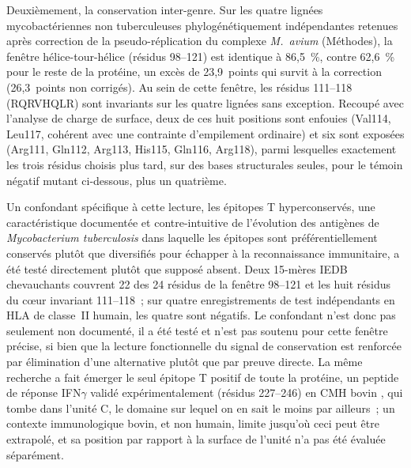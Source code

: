 \documentclass[11pt,a4paper]{article}
\newcommand{\mtb}{\textit{Mycobacterium tuberculosis}}
\begin{document}
Deuxièmement, la conservation inter-genre. Sur les quatre lignées mycobactériennes non
tuberculeuses phylogénétiquement indépendantes retenues après correction de la pseudo-réplication
du complexe \textit{M.\ avium} (Méthodes), la fenêtre hélice-tour-hélice (résidus 98--121) est
identique à 86,5~\%, contre 62,6~\% pour le reste de la protéine, un excès de 23,9~points qui
survit à la correction (26,3~points non corrigés). Au sein de cette fenêtre, les résidus 111--118
(RQRVHQLR) sont invariants sur les quatre lignées sans exception. Recoupé avec l'analyse de charge
de surface, deux de ces huit positions sont enfouies (Val114, Leu117, cohérent avec une contrainte
d'empilement ordinaire) et six sont exposées (Arg111, Gln112, Arg113, His115, Gln116, Arg118),
parmi lesquelles exactement les trois résidus choisis plus tard, sur des bases structurales seules,
pour le témoin négatif mutant ci-dessous, plus un quatrième.

Un confondant spécifique à cette lecture, les épitopes T hyperconservés, une caractéristique
documentée et contre-intuitive de l'évolution des antigènes de \mtb{} dans laquelle les épitopes
sont préférentiellement conservés plutôt que diversifiés pour échapper à la reconnaissance
immunitaire, a été testé directement plutôt que supposé absent. Deux 15-mères IEDB chevauchants
couvrent 22 des 24 résidus de la fenêtre 98--121 et les huit résidus du cœur invariant 111--118~;
sur quatre enregistrements de test indépendants en HLA de classe~II humain, les quatre sont
négatifs. Le confondant n'est donc pas seulement non documenté, il a été testé et n'est pas soutenu
pour cette fenêtre précise, si bien que la lecture fonctionnelle du signal de conservation est
renforcée par élimination d'une alternative plutôt que par preuve directe. La même recherche a fait
émerger le seul épitope T positif de toute la protéine, un peptide de réponse IFN$\gamma$ validé
expérimentalement (résidus 227--246) en CMH bovin \citep{farrell2016botb}, qui tombe dans l'unité C,
le domaine sur lequel on en sait le moins par ailleurs~; un contexte immunologique bovin, et non
humain, limite jusqu'où ceci peut être extrapolé, et sa position par rapport à la surface de l'unité
n'a pas été évaluée séparément.
\end{document}

